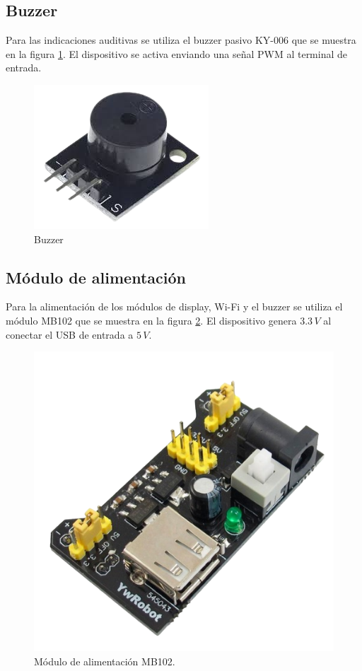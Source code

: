 \subsection{Buzzer}
Para las indicaciones auditivas se utiliza el buzzer pasivo KY-006 que se muestra en la figura \ref{fig:buzzer}. El dispositivo se activa enviando una señal PWM al terminal de entrada.

\begin{figure}[H]
  \centering
  \includegraphics[width=0.35\linewidth]{introduccion-especifica/img/buzzer.png}
  \caption{Buzzer}
  \label{fig:buzzer}
\end{figure}

\subsection{Módulo de alimentación}
Para la alimentación de los módulos de display, Wi-Fi y el buzzer se utiliza el módulo MB102 que se muestra en la figura \ref{fig:mb102}. El dispositivo genera \(3.3\,V\) al conectar el USB de entrada a \(5\,V\).

\begin{figure}[H]
  \centering
  \includegraphics[width=0.35\linewidth]{introduccion-especifica/img/mb102.png}
  \caption{Módulo de alimentación MB102.}
  \label{fig:mb102}
\end{figure}

